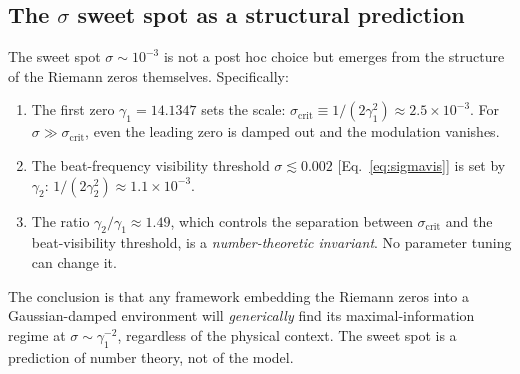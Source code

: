\documentclass[12pt,a4paper]{article}
\begin{document}
\subsection{The $\sigma$ sweet spot as a structural prediction}
\label{sec:sigmastructure}

The sweet spot $\sigma\sim 10^{-3}$ is not a
post hoc choice but emerges from the structure of the
Riemann zeros themselves.  Specifically:

\begin{enumerate}
\item The first zero $\gamma_1 = 14.1347$ sets the
  scale: $\sigma_{\mathrm{crit}} \equiv
  1/(2\gamma_1^2) \approx 2.5\times 10^{-3}$.
  For $\sigma\gg\sigma_{\mathrm{crit}}$,
  even the leading zero is damped out and the
  modulation vanishes.

\item The beat-frequency visibility threshold
  $\sigma\lesssim 0.002$
  [Eq.~\eqref{eq:sigmavis}] is set by $\gamma_2$:
  $1/(2\gamma_2^2)\approx 1.1\times 10^{-3}$.

\item The ratio $\gamma_2/\gamma_1 \approx 1.49$,
  which controls the separation between
  $\sigma_{\mathrm{crit}}$ and the beat-visibility
  threshold, is a \emph{number-theoretic invariant}.
  No parameter tuning can change it.
\end{enumerate}

\noindent
The conclusion is that any framework embedding the
Riemann zeros into a Gaussian-damped environment will
\emph{generically} find its maximal-information regime
at $\sigma\sim \gamma_1^{-2}$, regardless of the
physical context.  The sweet spot is a prediction
of number theory, not of the model.


\end{document}
